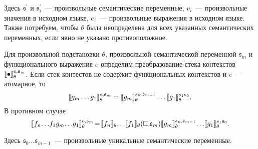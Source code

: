 \begin{definition}
\noindent Здесь ${\mathfrak s}^\prime$ и ${\mathfrak s}^\prime_i$~--- произвольные семантические переменные, $v_i$~--- произвольные значения в исходном языке, $e_i$~--- произвольные выражения в исходном языке.
Также потребуем, чтобы $\theta$ была неопределена для всех указанных семантических переменных, если явно не указано противоположное.
\end{definition}

\begin{definition}
\normalfont Для произвольной подстановки $\theta$, произвольной семантической переменной ${\mathfrak s}_m$ и функционального выражения $e$ определим преобразование стека контекстов $\llbracket{\bullet}\rrbracket^{e,{\mathfrak s}_m}_\theta$.
Если стек контестов не содержит функциональных контекстов и $e$~--- атомарное, то
$$\sembr{g_m\dots g_1}^{e,{\mathfrak s}_m}_\theta=\sembr{g_m}^{{\mathfrak s}_m{\mathfrak s}_{m-1}}_\theta\dots\sembr{g_1}^{{\mathfrak s}_1{\mathfrak s}_0}_\theta.$$
В противном случае
$$\sembr{f_n\!\dots\! f_1g_m\!\dots\! g_1}^{e,{\mathfrak s}_m}_\theta\!=\!\sembr{f_n}_\theta\!\dots\!\sembr{f_1}_\theta(\Box\,{\mathfrak s}_m)\sembr{g_m}^{{\mathfrak s}_m{\mathfrak s}_{m-1}}_\theta\!\dots\!\sembr{g_1}^{{\mathfrak s}_1{\mathfrak s}_0}_\theta.$$

\noindent Здесь ${\mathfrak s}_0\dots {\mathfrak s}_{m-1}$~--- произвольные уникальные семантические переменные.
\end{definition}

